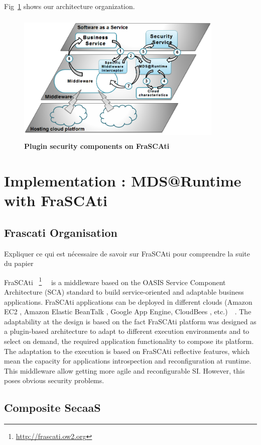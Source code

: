 \documentclass[runningheads,a4paper]{llncs}
\begin{document}
 Fig~\ref{fig:archi} shows our architecture organization. 
\begin{figure}[ht]  
\centering
\includegraphics[height=180pt, width=280pt]{architecture1.PNG}
\caption{\textbf{Plugin security components on FraSCAti}}
\label{fig:archi}
\end{figure}


\section{Implementation : MDS@Runtime with FraSCAti}
\subsection{Frascati Organisation}
Expliquer ce qui est n\'ecessaire de savoir sur FraSCAti pour comprendre la suite du papier

FraSCAti ~\footnote{\url{http://frascati.ow2.org}}~\cite{SMF09}~\cite{SMR12} is a middleware based on the OASIS Service Component Architecture (SCA) standard to build service-oriented and adaptable business applications. FraSCAti applications can be deployed in different clouds (Amazon EC2 , Amazon Elastic BeanTalk , Google App Engine, CloudBees , etc.)~\cite{MRS11}~\cite{PHM12}. The adaptability at the design is based on the fact FraSCAti platform was designed as a plugin-based architecture to adapt to different execution environments and to select on demand, the required application functionality to compose its platform. The adaptation to the execution is based on FraSCAti reflective features, which mean the capacity for applications introspection and reconfiguration at runtime. This middleware allow getting more agile and reconfigurable SI. However, this poses obvious security problems.
\subsection{Composite SecaaS}
\end{document}
